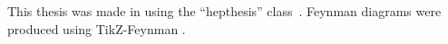 \begin{colophon}
  This thesis was made in \LaTeXe{} using the ``hepthesis'' class~\cite{hepthesis}.  Feynman diagrams were produced using TikZ-Feynman \cite{Ellis:2016jkw}.
\end{colophon}





